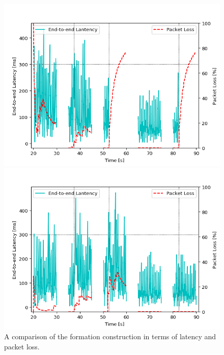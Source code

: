 \begin{figure}
 \centering
  \caption{A comparison of the formation construction in terms of latency and packet loss.}
  \begin{minipage}[b]{1\textwidth}
    \centering
    \includegraphics[scale=.8]{results/SDN/png/transmissions-old.png}
  \end{minipage}
  \hfill
  \begin{minipage}[b]{1\textwidth}
    \centering
    \includegraphics[scale=.8]{results/SDN/png/transmissions-new.png}
  \end{minipage}
  \label{fig:SDN-transmissions}
  \imagesource{\thisauthor}
\end{figure}